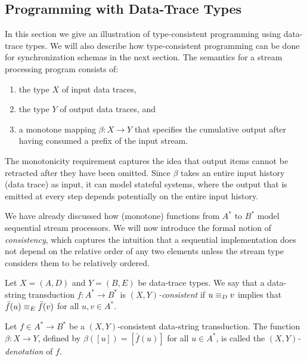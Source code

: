 \subsection{Programming with Data-Trace Types}
\label{subsec:dtt-2}

In this section we give an illustration of type-consistent programming
using data-trace types.
We will also describe how type-consistent programming can be done for
synchronization schemas in the next section.
The semantics for a stream processing program consists of:
\begin{enumerate}
\item
the type $X$ of input data traces,
\item
the type $Y$ of output data traces, and
\item
a monotone mapping $\beta: X \to Y$ that specifies the cumulative output after having consumed a prefix of the input stream.
\end{enumerate}
The monotonicity requirement captures the idea that output items cannot be retracted after they have been omitted. Since $\beta$ takes an entire input history (data trace) as input, it can model stateful systems, where the output that is emitted at every step depends potentially on the entire input history.

We have already discussed how (monotone) functions from $A^*$ to $B^*$ model sequential stream processors. We will now introduce the formal notion of \emph{consistency}, which captures the intuition that a sequential implementation does not depend on the relative order of any two elements unless the stream type considers them to be relatively ordered.

\begin{definition}[Consistency]
Let $X = (A,D)$ and $Y = (B,E)$ be data-trace types. We say that a data-string transduction $f: A^* \to B^*$
is \emph{$(X,Y)$-consistent} if $u \equiv_D v$ implies that $\bar{f}(u) \equiv_{E} \bar{f}(v)$ for all $u, v \in A^*$.

Let $f \in A^* \to B^*$ be a $(X,Y)$-consistent data-string transduction. The function $\beta: X \to Y$, defined by
$\beta([u]) = [\bar f(u)]$ for all $u \in A^*$, is called the \emph{$(X,Y)$-denotation} of $f$.
\end{definition}

